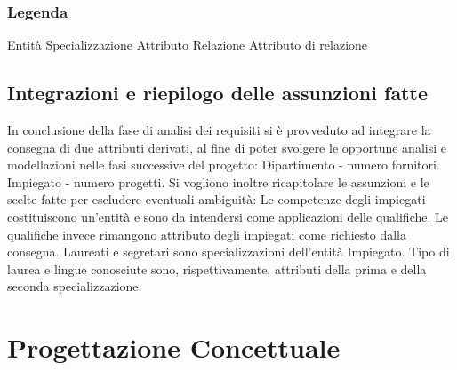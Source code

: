 \documentclass{article}
\begin{document}
\subsubsection*{Legenda}
{\color{red}Entità}
\newline
{\color{orange}Specializzazione}
\newline
{\color{magenta}Attributo}
\newline
{\color{blue}Relazione}
\newline
{\color{teal}Attributo di relazione}

\subsection{Integrazioni e riepilogo delle assunzioni fatte}
In conclusione della fase di analisi dei requisiti si è provveduto ad integrare la consegna di due attributi derivati, al fine di poter svolgere le opportune analisi e modellazioni nelle fasi successive del progetto:
\newline
\newline
Dipartimento - numero fornitori.
\newline
Impiegato - numero progetti.
\newline
\newline
Si vogliono inoltre ricapitolare le assunzioni e le scelte fatte per escludere eventuali ambiguità:
\newline
\newline
Le competenze degli impiegati costituiscono un'entità e sono da intendersi come applicazioni delle qualifiche.
\newline
Le qualifiche invece rimangono attributo degli impiegati come richiesto dalla consegna.
\newline
\newline
Laureati e segretari sono specializzazioni dell'entità Impiegato.
\newline
Tipo di laurea e lingue conosciute sono, rispettivamente, attributi della prima e della seconda specializzazione.
\newline

\newpage

\section{Progettazione Concettuale}
\end{document}
